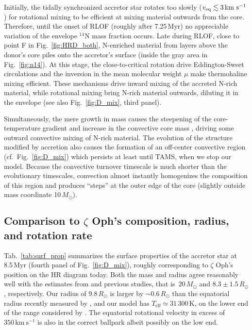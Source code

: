 \documentclass[twocolumn,twocolappendix,trackchanges]{aastex63}
\newcommand{\kms}{{\mathrm{km\ s^{-1}}}}
\DeclareRobustCommand{\Figref}[1]{Fig.~\ref{#1}}
\DeclareRobustCommand{\Tabref}[1]{Tab.~\ref{#1}}
\newcommand{\zoph}{$\zeta$ Oph}
\begin{document}
Initially, the tidally synchronized accretor star rotates too slowly
($v_{\rm eq} \lesssim 3\,\kms$) for rotational mixing to be efficient at mixing material outwards from
the core. Therefore, until the onset of RLOF (roughly after 7.25\,Myr) no
appreciable variation of the envelope $^{14}\mathrm{N}$ mass fraction
occurs. %
Late during RLOF, close to point F in %
\Figref{fig:HRD_both}, N-enriched material from layers above the donor's core piles
onto the accretor's surface (inside the gray area in \Figref{fig:n14}). At this stage, the
close-to-critical rotation drive Eddington-Sweet circulations and
the inversion in the mean molecular weight $\mu$ make thermohaline
mixing efficient. These mechanisms drive inward mixing of the accreted N-rich material, while rotational mixing bring N-rich material outwards, diluting it in the envelope (see also \Figref{fig:D_mix}, third panel).

Simultaneously, the mere growth in mass causes the steepening of the
core-temperature gradient and increase in the convective core mass
\citep[rejuvenation, e.g.,][]{schneider:16}, driving some outward
convective mixing of N-rich material. 
The evolution of the structure
modified by accretion also causes the formation of an off-center
convective region (cf.~\Figref{fig:D_mix}) which persists at least
until TAMS, when we stop our model. Because the convective turnover
timescale is much shorter than the evolutionary timescales, convection
almost instantly homogenizes the composition of this region and produces ``steps'' at
the outer edge of the core (slightly outside mass coordinate
10\,$M_\odot$).



\subsection{Comparison to \zoph's composition, radius, and rotation rate}
\label{sec:surf_comp}


\Tabref{tab:surf_prop} summarizes the surface properties of the
accretor star at 8.5\,Myr (fourth panel of \Figref{fig:D_mix}),
roughly corresponding to \zoph's position on the HR diagram
today. Both the mass and radius agree reasonably well with the
estimates from  and previous studies, that
is~$20\,M_\odot$ and $8.3\pm1.5\,R_\odot$, respectively. Our radius of
$9.8\,R_\odot$ is larger by $\sim0.6\,R_\odot$ than the equatorial
radius recently measured by \cite{gordon:18}, and our model has
$T_\mathrm{eff}\simeq31\,300$\,K, on the lower end of the range
considered by . The equatorial
rotational velocity in excess of $350\,\kms$ is also in the correct
ballpark albeit possibly on the low end.
\end{document}

